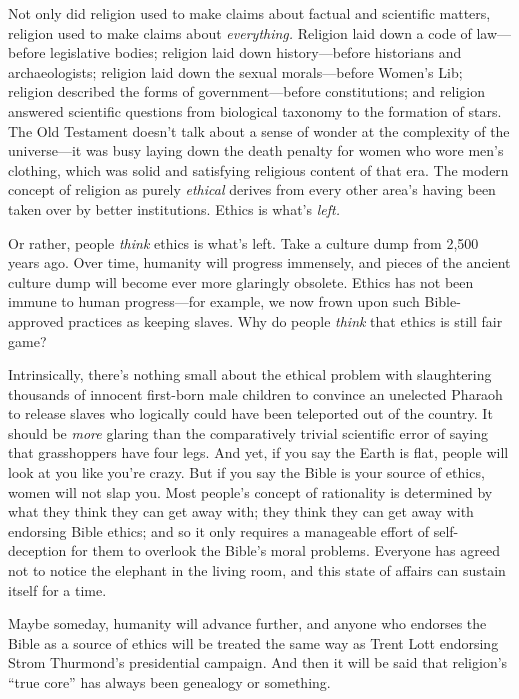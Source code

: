 {
 Not only did religion used to make claims about factual and
scientific matters, religion used to make claims about
\textit{everything.} Religion laid down a code of law---before
legislative bodies; religion laid down history---before historians and
archaeologists; religion laid down the sexual morals---before
Women's Lib; religion described the forms of
government---before constitutions; and religion answered scientific
questions from biological taxonomy to the formation of stars. The Old
Testament doesn't talk about a sense of wonder at the
complexity of the universe---it was busy laying down the death penalty
for women who wore men's clothing, which was solid and
satisfying religious content of that era. The modern concept of
religion as purely \textit{ethical} derives from every other
area's having been taken over by better institutions.
Ethics is what's \textit{left.}}

{
 Or rather, people \textit{think} ethics is what's
left. Take a culture dump from 2,500 years ago. Over time, humanity
will progress immensely, and pieces of the ancient culture dump will
become ever more glaringly obsolete. Ethics has not been immune to
human progress---for example, we now frown upon such Bible-approved
practices as keeping slaves. Why do people \textit{think} that ethics
is still fair game?}

{
 Intrinsically, there's nothing small about the
ethical problem with slaughtering thousands of innocent first-born male
children to convince an unelected Pharaoh to release slaves who
logically could have been teleported out of the country. It should be
\textit{more} glaring than the comparatively trivial scientific error
of saying that grasshoppers have four legs. And yet, if you say the
Earth is flat, people will look at you like you're
crazy. But if you say the Bible is your source of ethics, women will
not slap you. Most people's concept of rationality is
determined by what they think they can get away with; they think they
can get away with endorsing Bible ethics; and so it only requires a
manageable effort of self-deception for them to overlook the
Bible's moral problems. Everyone has agreed not to
notice the elephant in the living room, and this state of affairs can
sustain itself for a time.}

{
 Maybe someday, humanity will advance further, and anyone who
endorses the Bible as a source of ethics will be treated the same way
as Trent Lott endorsing Strom Thurmond's presidential
campaign. And then it will be said that religion's
``true core'' has always been
genealogy or something.}

